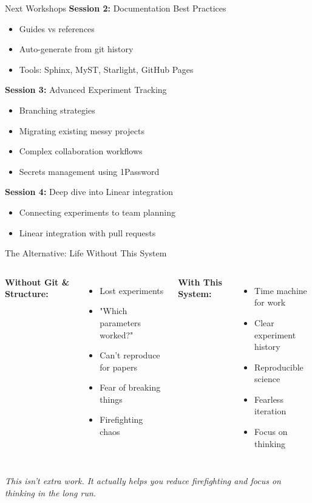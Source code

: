 \documentclass{beamer}
\begin{document}
\begin{frame}{Next Workshops}
\textbf{Session 2:} Documentation Best Practices
\begin{itemize}
    \item Guides vs references
    \item Auto-generate from git history
    \item Tools: Sphinx, MyST, Starlight, GitHub Pages
\end{itemize}

\vspace{1em}
\textbf{Session 3:} Advanced Experiment Tracking
\begin{itemize}
    \item Branching strategies
    \item Migrating existing messy projects
    \item Complex collaboration workflows
    \item Secrets management using 1Password
\end{itemize}

\vspace{1em}
\textbf{Session 4:} Deep dive into Linear integration
\begin{itemize}
    \item Connecting experiments to team planning
    \item Linear integration with pull requests
\end{itemize}
\end{frame}

\begin{frame}{The Alternative: Life Without This System}
    \begin{columns}
    \textbf{Without Git \& Structure:}
    \begin{itemize}
        \item Lost experiments
        \item "Which parameters worked?"
        \item Can't reproduce for papers
        \item Fear of breaking things
        \item Firefighting chaos
    \end{itemize}
    
    \textbf{With This System:}
    \begin{itemize}
        \item Time machine for work
        \item Clear experiment history
        \item Reproducible science
        \item Fearless iteration
        \item Focus on thinking
    \end{itemize}
    \end{columns}
    
    \vspace{1em}
    \centering
    \textit{This isn't extra work. It actually helps you reduce firefighting and focus on thinking in the long run.}
    \end{frame}
\end{document}
